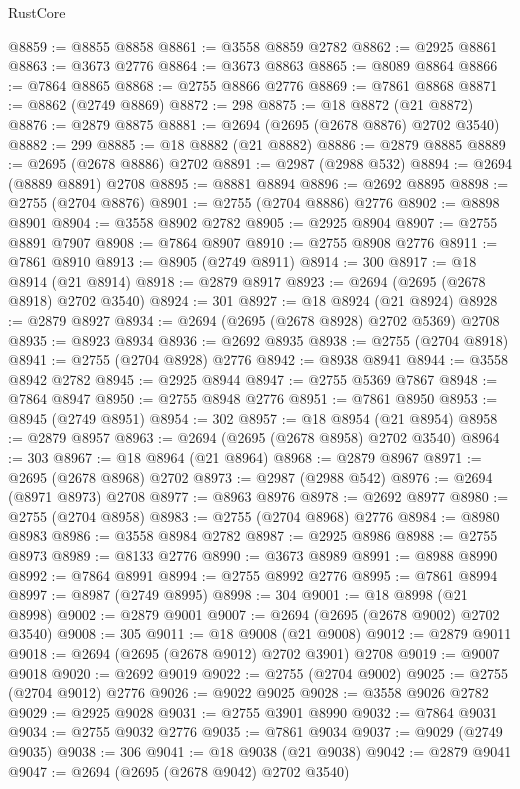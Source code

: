 \begin{lexlean}{RustCore}
\begin{coremodule}
@8859 := @8855 @8858
@8861 := @3558 @8859 @2782
@8862 := @2925 @8861
@8863 := @3673 @2776
@8864 := @3673 @8863
@8865 := @8089 @8864
@8866 := @7864 @8865
@8868 := @2755 @8866 @2776
@8869 := @7861 @8868
@8871 := @8862 (@2749 @8869)
@8872 := 298
@8875 := @18 @8872 (@21 @8872)
@8876 := @2879 @8875
@8881 := @2694 (@2695 (@2678 @8876) @2702 @3540)
@8882 := 299
@8885 := @18 @8882 (@21 @8882)
@8886 := @2879 @8885
@8889 := @2695 (@2678 @8886) @2702
@8891 := @2987 (@2988 @532)
@8894 := @2694 (@8889 @8891) @2708
@8895 := @8881 @8894
@8896 := @2692 @8895
@8898 := @2755 (@2704 @8876)
@8901 := @2755 (@2704 @8886) @2776
@8902 := @8898 @8901
@8904 := @3558 @8902 @2782
@8905 := @2925 @8904
@8907 := @2755 @8891 @7907
@8908 := @7864 @8907
@8910 := @2755 @8908 @2776
@8911 := @7861 @8910
@8913 := @8905 (@2749 @8911)
@8914 := 300
@8917 := @18 @8914 (@21 @8914)
@8918 := @2879 @8917
@8923 := @2694 (@2695 (@2678 @8918) @2702 @3540)
@8924 := 301
@8927 := @18 @8924 (@21 @8924)
@8928 := @2879 @8927
@8934 := @2694 (@2695 (@2678 @8928) @2702 @5369) @2708
@8935 := @8923 @8934
@8936 := @2692 @8935
@8938 := @2755 (@2704 @8918)
@8941 := @2755 (@2704 @8928) @2776
@8942 := @8938 @8941
@8944 := @3558 @8942 @2782
@8945 := @2925 @8944
@8947 := @2755 @5369 @7867
@8948 := @7864 @8947
@8950 := @2755 @8948 @2776
@8951 := @7861 @8950
@8953 := @8945 (@2749 @8951)
@8954 := 302
@8957 := @18 @8954 (@21 @8954)
@8958 := @2879 @8957
@8963 := @2694 (@2695 (@2678 @8958) @2702 @3540)
@8964 := 303
@8967 := @18 @8964 (@21 @8964)
@8968 := @2879 @8967
@8971 := @2695 (@2678 @8968) @2702
@8973 := @2987 (@2988 @542)
@8976 := @2694 (@8971 @8973) @2708
@8977 := @8963 @8976
@8978 := @2692 @8977
@8980 := @2755 (@2704 @8958)
@8983 := @2755 (@2704 @8968) @2776
@8984 := @8980 @8983
@8986 := @3558 @8984 @2782
@8987 := @2925 @8986
@8988 := @2755 @8973
@8989 := @8133 @2776
@8990 := @3673 @8989
@8991 := @8988 @8990
@8992 := @7864 @8991
@8994 := @2755 @8992 @2776
@8995 := @7861 @8994
@8997 := @8987 (@2749 @8995)
@8998 := 304
@9001 := @18 @8998 (@21 @8998)
@9002 := @2879 @9001
@9007 := @2694 (@2695 (@2678 @9002) @2702 @3540)
@9008 := 305
@9011 := @18 @9008 (@21 @9008)
@9012 := @2879 @9011
@9018 := @2694 (@2695 (@2678 @9012) @2702 @3901) @2708
@9019 := @9007 @9018
@9020 := @2692 @9019
@9022 := @2755 (@2704 @9002)
@9025 := @2755 (@2704 @9012) @2776
@9026 := @9022 @9025
@9028 := @3558 @9026 @2782
@9029 := @2925 @9028
@9031 := @2755 @3901 @8990
@9032 := @7864 @9031
@9034 := @2755 @9032 @2776
@9035 := @7861 @9034
@9037 := @9029 (@2749 @9035)
@9038 := 306
@9041 := @18 @9038 (@21 @9038)
@9042 := @2879 @9041
@9047 := @2694 (@2695 (@2678 @9042) @2702 @3540)

\end{coremodule}
\end{lexlean}
